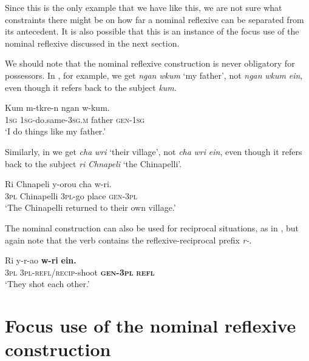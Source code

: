 \documentclass[output=paper]{langscibook}
\begin{document}
Since this is the only example that we have like this, we are not sure what constraints there might be on how far a nominal reflexive can be separated from its antecedent. It is also possible that this is an instance of the focus use of the nominal reflexive discussed in the next section.



  We should note that the nominal reflexive construction is never obligatory for possessors. In , for example, we get \emph{ngan} \emph{wkum} ‘my father’, not \emph{ngan} \emph{wkum} \emph{ein}, even though it refers back to the subject \emph{kum}.


\ea%
    \label{ex:Brown:60}
    \gll Kum  m-tkre-n  ngan  w-kum.\\
 \textsc{1sg}  \textsc{1sg-}do.same\textsc{{}-3sg.m}  father  \textsc{gen}{}-\textsc{1sg}\\
    \glt  ‘I do things like my father.’
    \z

          
Similarly, in  we get \emph{cha} \emph{wri} ‘their village’, not \emph{cha} \emph{wri} \emph{ein}, even though it refers back to the subject \emph{ri} \emph{Chnapeli} ‘the Chinapelli’.


\ea%
    \label{ex:Brown:61}
    \gll Ri  Chnapeli  y-orou  cha  w-ri.\\
 \textsc{3pl}  Chinapelli  \textsc{3pl}{}-go  place  \textsc{gen}{}-\textsc{3pl}\\
    \glt ‘The Chinapelli returned to their own village.’
    \z

          
{\textasciigrave}  The nominal construction can also be used for reciprocal situations, as in , but again note that the verb contains the reflexive-reciprocal prefix \emph{r-}.



\ea%
    \label{ex:Brown:62}
    \gll Ri  y-r-ao  \textbf{w-ri}  \textbf{ein.}\\
 \textsc{3pl}  \textsc{3pl-refl/recip}{}-shoot  \textbf{\textsc{gen}}\textbf{{}-}\textbf{\textsc{3pl}}  \textbf{\textsc{refl}}\\
    \glt ‘They shot each other.’
    \z

\section{Focus use of the nominal reflexive construction}\label{sec:Brown:6} %
\end{document}
